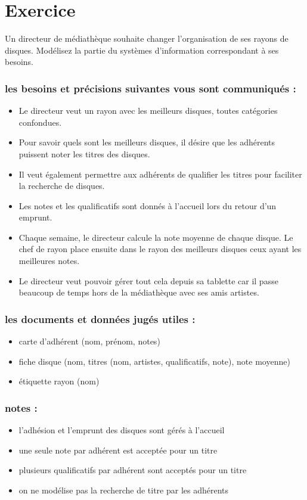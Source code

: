 \section*{Exercice}
Un directeur de médiathèque souhaite changer l'organisation de ses rayons de disques. Modélisez la partie du systèmes d'information correspondant à ses besoins.


\subsubsection*{les besoins et précisions suivantes vous sont communiqués :}
\begin{itemize}
    \item Le directeur veut un rayon avec les meilleurs disques, toutes catégories confondues.
    \item Pour savoir quels sont les meilleurs disques, il désire que les adhérents puissent noter les titres des disques.
    \item Il veut également permettre aux adhérents de qualifier les titres pour faciliter la recherche de disques.
    \item Les notes et les qualificatifs sont donnés à l'accueil lors du retour d'un emprunt.
    \item Chaque semaine, le directeur calcule la note moyenne de chaque disque. Le chef de rayon place ensuite dans le rayon des meilleurs disques ceux ayant les meilleures notes.
    \item Le directeur veut pouvoir gérer tout cela depuis sa tablette car il passe beaucoup de temps hors de la médiathèque avec ses amis artistes.
\end{itemize}

\subsubsection*{les documents et données jugés utiles :}
\begin{itemize}
    \item carte d'adhérent (nom, prénom, notes)
    \item fiche disque (nom, titres (nom, artistes, qualificatifs, note), note moyenne)
    \item étiquette rayon (nom)
\end{itemize}

\subsubsection*{notes :}
\begin{itemize}
    \item l'adhésion et l'emprunt des disques sont gérés à l'accueil
    \item une seule note par adhérent est acceptée pour un titre 
    \item plusieurs qualificatifs par adhérent sont acceptés pour un titre
    \item on ne modélise pas la recherche de titre par les adhérents
\end{itemize}
